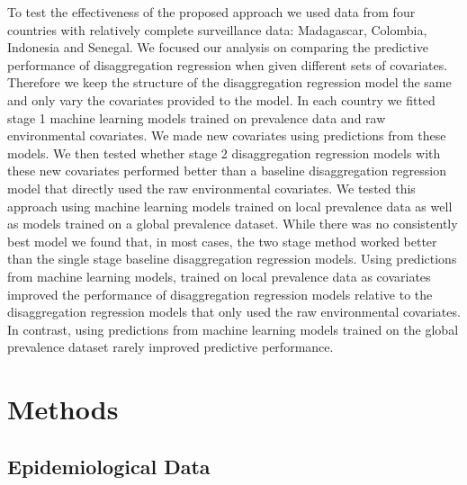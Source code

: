 \documentclass[review]{elsarticle}
\begin{document}
To test the effectiveness of the proposed approach we used data from four countries with relatively complete surveillance data: Madagascar, Colombia, Indonesia and Senegal.
We focused our analysis on comparing the predictive performance of disaggregation regression when given different sets of covariates.
Therefore we keep the structure of the disaggregation regression model the same and only vary the covariates provided to the model.
In each country we fitted stage 1 machine learning models trained on prevalence data and raw environmental covariates.
We made new covariates using predictions from these models.
We then tested whether stage 2 disaggregation regression models with these new covariates performed better than a baseline disaggregation regression model that directly used the raw environmental covariates.
We tested this approach using machine learning models trained on local prevalence data as well as models trained on a global prevalence dataset.
While there was no consistently best model we found that, in most cases, the two stage method worked better than the single stage baseline disaggregation regression models.
Using predictions from machine learning models, trained on local prevalence data as covariates improved the performance of disaggregation regression models relative to the disaggregation regression models that only used the raw environmental covariates.
In contrast, using predictions from machine learning models trained on the global prevalence dataset rarely improved predictive performance.

\section{Methods}

\subsection{Epidemiological Data}
\end{document}
